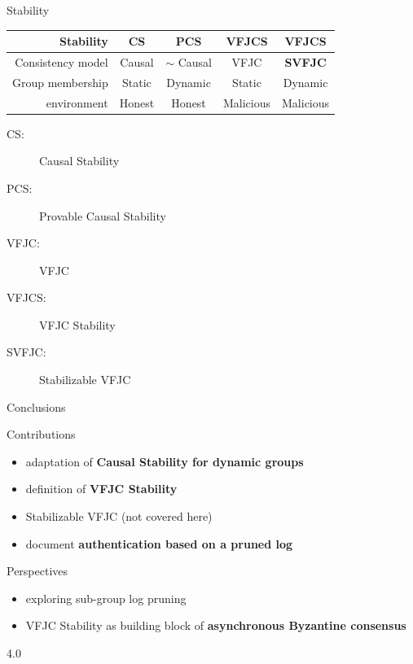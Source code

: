 \documentclass[xcolor=table]{beamer}
\begin{document}
\begin{frame}{Stability}
    \begin{tabular}{r| c c c c}
        Stability & CS & \textbf{PCS} & \textbf{VFJCS} & \textbf{VFJCS} \\ \hline
        Consistency model & Causal & $\sim$ Causal & \acs{VFJC} & \textbf{SVFJC} \\
        Group membership & Static & Dynamic & Static & Dynamic \\
        environment & Honest & Honest & Malicious & Malicious \\
    \end{tabular}
    \begin{description}
    \item[CS:] Causal Stability
    \item[PCS:] Provable Causal Stability
    \item[VFJC:] \acl{VFJC}
    \item[VFJCS:] \acl{VFJC} Stability
    \item[SVFJC:] Stabilizable \acl{VFJC}
    \end{description}
\end{frame}

\begin{frame}{Conclusions}
    \begin{block}{Contributions}
        \begin{itemize}
            \item adaptation of \textbf{Causal Stability for dynamic groups}
            \item definition of \textbf{\acs{VFJC} Stability}
            \item Stabilizable \ac{VFJC} (not covered here)
            \item document \textbf{authentication based on a pruned log}
        \end{itemize}
    \end{block}
    \begin{block}{Perspectives}
        \begin{itemize}
            \item exploring sub-group log pruning
            \item \acs{VFJC} Stability as building block of \textbf{asynchronous Byzantine consensus}
        \end{itemize}
    \end{block}
\end{frame}

\begin{frame}
    \vspace{1em}
    \printbibliography%
    \begin{center}\ccby\hspace{3pt}4.0\end{center}
\end{frame}
\end{document}
